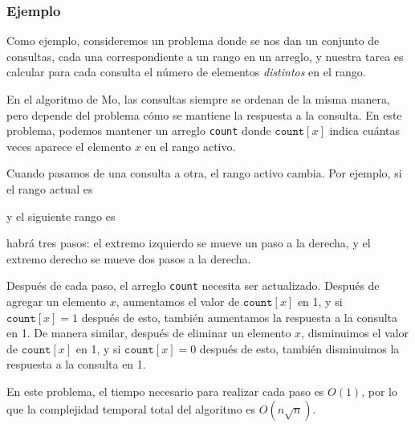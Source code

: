 \subsubsection*{Ejemplo}

Como ejemplo, consideremos un problema donde se nos dan un conjunto de consultas,
cada una correspondiente a un rango en un arreglo,
y nuestra tarea es calcular para cada consulta
el número de elementos \emph{distintos} en el rango.

En el algoritmo de Mo, las consultas siempre se ordenan de la misma manera, pero depende del problema cómo se mantiene la respuesta a la consulta.
En este problema, podemos mantener un arreglo \texttt{count} donde $\texttt{count}[x]$
indica cuántas veces aparece el elemento $x$
en el rango activo.

Cuando pasamos de una consulta a otra,
el rango activo cambia.
Por ejemplo, si el rango actual es
\begin{center}
\end{center}
y el siguiente rango es
\begin{center}
\end{center}
habrá tres pasos:
el extremo izquierdo se mueve un paso a la derecha,
y el extremo derecho se mueve dos pasos a la derecha.

Después de cada paso, el arreglo \texttt{count}
necesita ser actualizado.
Después de agregar un elemento $x$,
aumentamos el valor de 
$\texttt{count}[x]$ en 1,
y si $\texttt{count}[x]=1$ después de esto,
también aumentamos la respuesta a la consulta en 1.
De manera similar, después de eliminar un elemento $x$,
disminuimos el valor de 
$\texttt{count}[x]$ en 1,
y si $\texttt{count}[x]=0$ después de esto,
también disminuimos la respuesta a la consulta en 1.

En este problema, el tiempo necesario para realizar
cada paso es $O(1)$, por lo que la complejidad temporal
total del algoritmo es $O(n \sqrt n)$.
